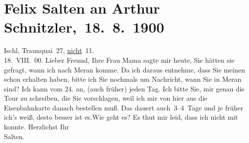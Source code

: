 

         
         \renewcommand{\erwaehntePersonen}{Personen: Caroline Kotter, Ottmar Peter Kotter, Elisabeth Kotter, Leopoldine Müller, Felix Salten, Louise Schnitzler}
         \renewcommand{\erwaehnteOrte}{Orte: Bad Ischl, Meran, Schruns, Thusis, Traunkai}
         \renewcommand{\erwaehnteWerke}{}
               \section[ Felix Salten an Arthur Schnitzler, 18. 8. 1900]{ Felix Salten an Arthur Schnitzler, 18. 8. 1900}\nopagebreak{}\rehead{ }\begin{ledgroupsized}[t]{13cm}\normalsize\beginnumbering \toendnotes[C]{\smallbreak\pagebreak[2]} 
\toendnotes[C]{\smallbreak}\pstart
           \raggedleft{}{\pb}Ischl, Traunquai 27, \uline{nicht} 11. {\\}18. VIII. 00.\pend
           \pstart
           Lieber Freund, Ihre Frau Mama sagte mir heute, Sie
               hätten sie gefragt, wann ich nach Meran komme.
               Da ich daraus entnehme, dass Sie meinen \label{K_L03311-1v}\label{K_L03311-1h} schon erhalten haben, bitte ich Sie nochmals um Nachricht, wann Sie in Meran sind? Ich kann vom
                  24. an, (auch früher) jeden Tag. Ich bitte Sie, mir
               genau die Tour zu schreiben, die Sie vorschlagen, weil ich mir von hier aus die
               Eisenbahnkarte danach bestellen muß. Das dauert auch 3–4 Tage und je früher ich’s
               weiß, desto besser ist es.\hspace*{2em}Wie geht es? Es thut mir leid, dass ich nicht mit
               konnte.\pend
           \pstart
            Herzlichst Ihr {\\[\baselineskip]}\spacefill\mbox{Salten.}\pend

\end{ledgroupsized}
